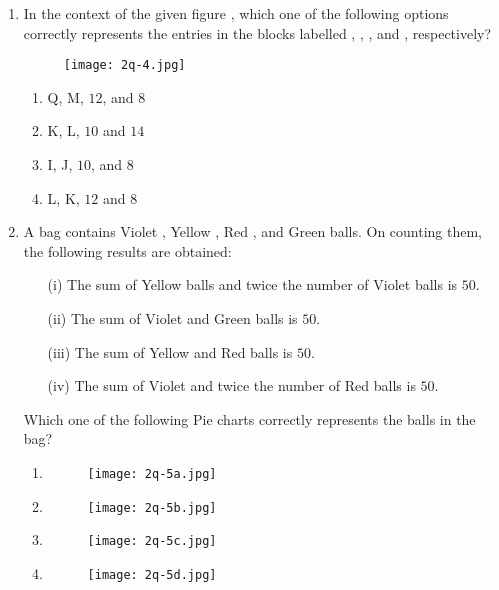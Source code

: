 \documentclass[journal,12pt,onecolumn]{article}
\theoremstyle{remark}
\begin{document}
\begin{enumerate}
    \item In the context of the given figure , which one of the following options correctly represents the entries in the blocks labelled , , , and , respectively?
    \begin{figure}[H]
        \centering
        \texttt{[image: 2q-4.jpg]}
        \caption{}
        \label{fig:q4}
    \end{figure}

    \hfill{}
    \begin{enumerate}
        \item Q, M, $12$, and $8$
        \item K, L, $10$ and $14$
        \item I, J, $10$, and $8$
        \item L, K, $12$ and $8$
    \end{enumerate}

    \item A bag contains Violet , Yellow , Red , and Green  balls. On counting them, the following results are obtained:
    \begin{enumerate}
        \item[(i)] The sum of Yellow balls and twice the number of Violet balls is $50$.
        \item[(ii)] The sum of Violet and Green balls is $50$.
        \item[(iii)] The sum of Yellow and Red balls is $50$.
        \item[(iv)] The sum of Violet and twice the number of Red balls is $50$.
    \end{enumerate}
    Which one of the following Pie charts correctly represents the balls in the bag?

    \hfill{}
   \begin{enumerate}
       \item \begin{figure}[H]
        \centering
        \texttt{[image: 2q-5a.jpg]}
        \caption{}
        \label{fig:q4}
    \end{figure}
     \item \begin{figure}[H]
        \centering
        \texttt{[image: 2q-5b.jpg]}
        \caption{}
        \label{fig:q4}
    \end{figure}
     \item \begin{figure}[H]
        \centering
        \texttt{[image: 2q-5c.jpg]}
        \caption{}
        \label{fig:q4}
    \end{figure}
     \item \begin{figure}[H]
        \centering
        \texttt{[image: 2q-5d.jpg]}
        \caption{}
        \label{fig:q4}
    \end{figure}
   \end{enumerate}


\end{enumerate}
\end{document}
